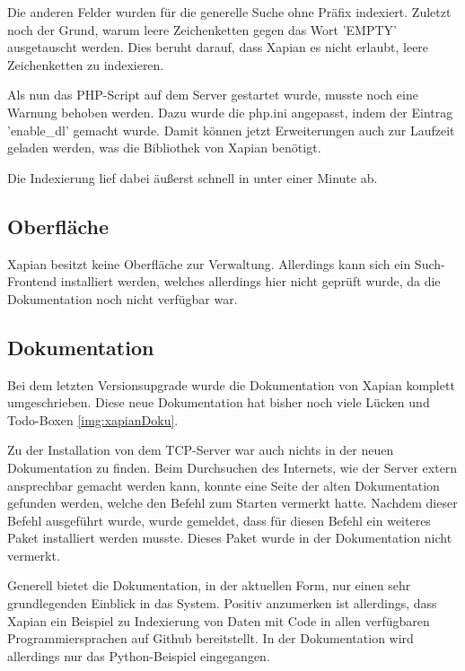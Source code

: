 Die anderen Felder wurden für die generelle Suche ohne Präfix indexiert. Zuletzt noch der Grund, warum leere Zeichenketten gegen das Wort 'EMPTY' ausgetauscht werden. Dies beruht darauf, dass Xapian es nicht erlaubt, leere Zeichenketten zu indexieren.

Als nun das PHP-Script auf dem Server gestartet wurde, musste noch eine Warnung behoben werden. Dazu wurde die php.ini angepasst, indem der Eintrag 'enable\_dl' gemacht wurde. Damit können jetzt Erweiterungen auch zur Laufzeit geladen werden, was die Bibliothek von Xapian benötigt. 

Die Indexierung lief dabei äußerst schnell in unter einer Minute ab. \cite{Xapian.21.1.2020}

\subsection{Oberfläche}

Xapian besitzt keine Oberfläche zur Verwaltung. Allerdings kann sich ein Such-Frontend installiert werden, welches allerdings hier nicht geprüft wurde, da die Dokumentation noch nicht verfügbar war.

\subsection{Dokumentation}

Bei dem letzten Versionsupgrade wurde die Dokumentation von Xapian komplett umgeschrieben. Diese neue Dokumentation hat bisher noch viele Lücken und Todo-Boxen \ref{img:xapianDoku}.

Zu der Installation von dem TCP-Server war auch nichts in der neuen Dokumentation zu finden. Beim Durchsuchen des Internets, wie der Server extern ansprechbar gemacht werden kann, konnte eine Seite der alten Dokumentation gefunden werden, welche den Befehl zum Starten vermerkt hatte. Nachdem dieser Befehl ausgeführt wurde, wurde gemeldet, dass für diesen Befehl ein weiteres Paket installiert werden musste. Dieses Paket wurde in der Dokumentation nicht vermerkt. 

Generell bietet die Dokumentation, in der aktuellen Form, nur einen sehr grundlegenden Einblick in das System. Positiv anzumerken ist allerdings, dass Xapian ein Beispiel zu Indexierung von Daten mit Code in allen verfügbaren Programmiersprachen auf Github bereitstellt. \cite{Xapian.25.2.2020} In der Dokumentation wird allerdings nur das Python-Beispiel eingegangen.

